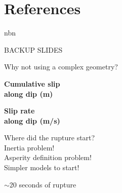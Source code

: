 \documentclass{beamer}
\newcommand\dirbiblio{../../biblio}
\begin{document}
\section*{References}
\begin{frame}nbn 

    {\tiny  }							    

\end{frame}

\begin{frame}
 
 \huge \center BACKUP SLIDES
 
\end{frame}


\begin{frame}
 {Why not using a complex geometry?}
 
 \begin{minipage}{0.28\linewidth}
 \begin{center}
  {\bf Cumulative slip \\ along dip (m)}
 \end{center}
 \end{minipage}
 \begin{minipage}{0.28\linewidth}
 \begin{center}
 {\bf Slip rate \\ along dip (m/s)}
 \end{center}
 \end{minipage}
 \begin{minipage}{0.4\linewidth}
  \small Where did the rupture start?
  \\ \vspace{10pt}
  \small Inertia problem!
  \\ \vspace{10pt}
  \small Asperity definition problem!
  \\ \vspace{10pt}
  \small Simpler models to start!
 \end{minipage}
 
 \begin{center}
  $\sim$20 seconds of rupture
 \end{center}

\end{frame}
\end{document}
